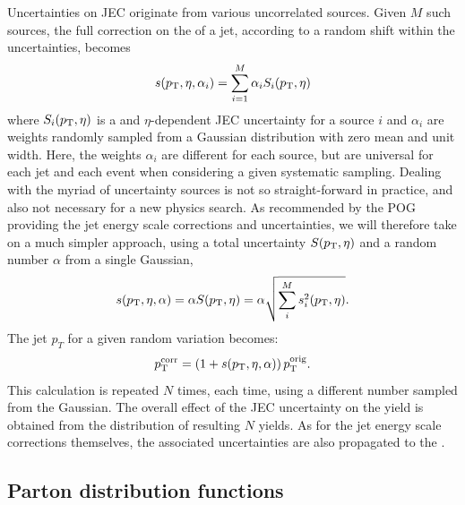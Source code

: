 Uncertainties on JEC originate from various uncorrelated sources.   
Given $M$ such sources, the full correction on the \pt of a jet, according to a random shift
within the uncertainties, becomes 
\begin{equation}
s(p_{\mathrm{T}}, \eta, \alpha_i) = \sum_{i=1}^M \alpha_i S_i (p_{\mathrm{T}}, \eta)
\end{equation}
where $S_i (p_{\mathrm{T}}, \eta)$ is a \pt and $\eta$-dependent JEC uncertainty for a source $i$ and
$\alpha_i$ are weights randomly sampled from a Gaussian distribution with zero mean and unit
width. 
Here, the weights $\alpha_i$ are different for each source, but are universal for each jet and each
event when considering a given systematic sampling.
Dealing with the myriad of uncertainty sources is not so straight-forward in practice, and also not
necessary for a new physics search. As recommended by the POG providing the jet energy scale
corrections and uncertainties, we will therefore take on a much simpler approach, using a total
uncertainty $S (p_{\mathrm{T}}, \eta)$ and a random number $\alpha$ from a single Gaussian,
\begin{equation}
s(p_{\mathrm{T}}, \eta, \alpha) = \alpha S (p_{\mathrm{T}}, \eta) = \alpha \sqrt {\sum_i^M s_i^2 (p_{\mathrm{T}}, \eta) }.
\end{equation}
The jet $p_T$ for a given random variation becomes:
\begin{equation}
p_{\mathrm{T}}^{\rm corr} = \left(1 + s(p_{\mathrm{T}}, \eta, \alpha)\right) p_{\mathrm{T}}^{\rm orig}.
\end{equation}
This calculation is repeated $N$ times, each time, using a different number sampled from the
Gaussian.  
The overall effect of the JEC uncertainty on the yield is obtained from the distribution of
resulting $N$ yields.  
As for the jet energy scale corrections themselves, the associated uncertainties are also
propagated to the \VEtmiss.


\subsection{Parton distribution functions \label{sec:boost_pdf_unc}} 

